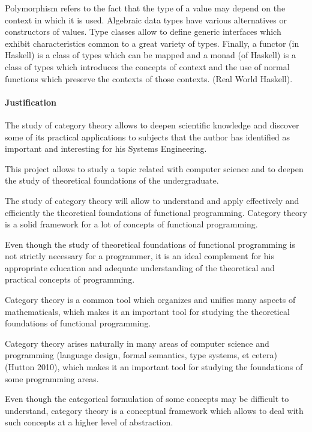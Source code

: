 Polymorphism refers to the fact that the type of a value may depend on
the context in which it is used. Algebraic data types have various
alternatives or constructors of values. Type classes allow to define
generic interfaces which exhibit characteristics common to a great
variety of types. Finally, a functor (in Haskell) is a class of types
which can be mapped and a monad (of Haskell) is a class of types which
introduces the concepts of context and the use of normal functions
which preserve the contexts of those contexts. (Real World Haskell).

\paragraph{Justification}

The study of category theory allows to deepen scientific knowledge and
discover some of its practical applications to subjects that the
author has identified as important and interesting for his Systems
Engineering.

This project allows to study a topic related with computer science and
to deepen the study of theoretical foundations of the undergraduate.

The study of category theory will allow to understand and apply
effectively and efficiently the theoretical foundations of functional
programming. Category theory is a solid framework for a lot of
concepts of functional programming.

Even though the study of theoretical foundations of functional
programming is not strictly necessary for a programmer, it is an ideal
complement for his appropriate education and adequate understanding of
the theoretical and practical concepts of programming.

Category theory is a common tool which organizes and unifies many
aspects of mathematicals, which makes it an important tool for
studying the theoretical foundations of functional programming.

Category theory arises naturally in many areas of computer science and
programming (language design, formal semantics, type systems, et
cetera) (Hutton 2010), which makes it an important tool for studying
the foundations of some programming areas.

Even though the categorical formulation of some concepts may be
difficult to understand, category theory is a conceptual framework
which allows to deal with such concepts at a higher level of
abstraction.


